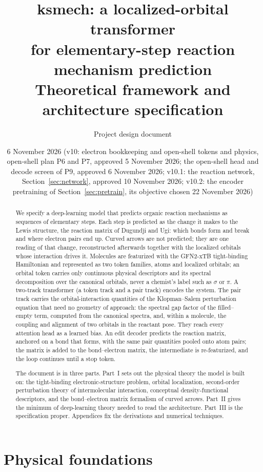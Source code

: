 \documentclass[11pt,a4paper]{article}
\title{\textbf{ksmech}: a localized-orbital transformer\\for elementary-step reaction mechanism prediction\\[4pt]\large Theoretical framework and architecture specification}
\author{Project design document}
\date{6 November 2026 (v10: electron bookkeeping and open-shell tokens and physics, open-shell plan P6 and P7, approved 5 November 2026; the open-shell head and decode screen of P9, approved 6 November 2026; v10.1: the reaction network, Section~\ref{sec:network}, approved 10 November 2026; v10.2: the encoder pretraining of Section~\ref{sec:pretrain}, its objective chosen 22 November 2026)}
\begin{document}
\maketitle

\begin{abstract}
We specify a deep-learning model that predicts organic reaction mechanisms as sequences of elementary steps. Each step is predicted as the change it makes to the Lewis structure, the reaction matrix of Dugundji and Ugi: which bonds form and break and where electron pairs end up. Curved arrows are not predicted; they are one reading of that change, reconstructed afterwards together with the localized orbitals whose interaction drives it. Molecules are featurized with the GFN2-xTB tight-binding Hamiltonian and represented as two token families, atoms and localized orbitals; an orbital token carries only continuous physical descriptors and its spectral decomposition over the canonical orbitals, never a chemist's label such as $\sigma$ or $\pi$. A two-track transformer (a token track and a pair track) encodes the system. The pair track carries the orbital-interaction quantities of the Klopman--Salem perturbation equation that need no geometry of approach: the spectral gap factor of the filled--empty term, computed from the canonical spectra, and, within a molecule, the coupling and alignment of two orbitals in the reactant pose. They reach every attention head as a learned bias. An edit decoder predicts the reaction matrix, anchored on a bond that forms, with the same pair quantities pooled onto atom pairs; the matrix is added to the bond--electron matrix, the intermediate is re-featurized, and the loop continues until a stop token.

The document is in three parts. Part~I sets out the physical theory the model is built on: the tight-binding electronic-structure problem, orbital localization, second-order perturbation theory of intermolecular interaction, conceptual density-functional descriptors, and the bond--electron matrix formalism of curved arrows. Part~II gives the minimum of deep-learning theory needed to read the architecture. Part~III is the specification proper. Appendices fix the derivations and numerical techniques.
\end{abstract}

\tableofcontents
\clearpage

\part{Physical foundations}
\end{document}
